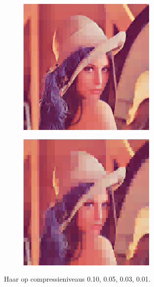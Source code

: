 \begin{figure}
\begin{subfigure}[b]{0.24\textwidth}
  \end{subfigure}
  \begin{subfigure}[b]{0.24\textwidth}
    \centering
    \includegraphics[width=\textwidth]{plaatjes/Lenna_haar_0_03.png}
  \end{subfigure}
  \begin{subfigure}[b]{0.24\textwidth}
    \centering
    \includegraphics[width=\textwidth]{plaatjes/Lenna_haar_0_01.png}
  \end{subfigure}
  \caption{Haar op compressieniveaus 0.10, 0.05, 0.03, 0.01.}
\end{figure}
